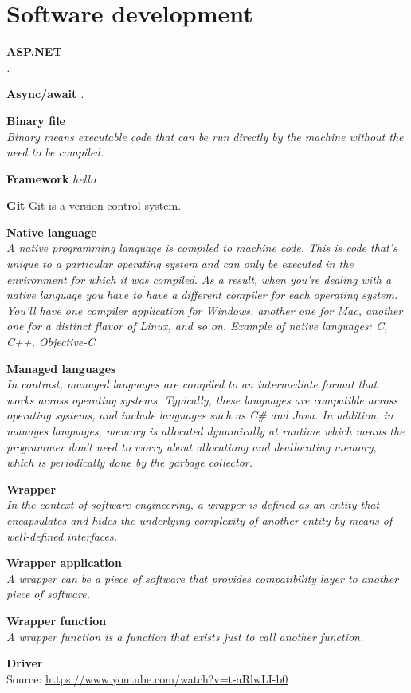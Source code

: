 \section{Software development}

\textbf{ASP.NET} \\
\textit{.} 

\textbf{Async/await}
\textit{.}

\textbf{Binary file} \\
\textit{Binary means executable code that can be run directly by the machine without the need to be compiled.}

\textbf{Framework}
\textit{hello}

\textbf{Git}
Git is a version control system. 

\textbf{Native language} \\
\textit{A native programming language is compiled to machine code. This is code that's unique to a particular operating system and can only be executed in the environment for which it was compiled. As a result, when you're dealing with a native language you have to have a different compiler for each operating system. You'll have one compiler application for Windows, another one for Mac, another one for a distinct flavor of Linux, and so on. Example of native languages: C, C++, Objective-C }

\textbf{Managed languages} \\
\textit{In contrast, managed languages are compiled to an intermediate format that works across operating systems. Typically, these languages are compatible across operating systems, and include languages such as C\# and Java. In addition, in manages languages, memory is allocated dynamically at runtime which means the programmer don't need to worry about allocationg and deallocating memory, which is periodically done by the garbage collector. }


\textbf{Wrapper} \\
\textit{In the context of software engineering, a wrapper is defined as an entity that encapsulates and hides the underlying complexity of another entity by means of well-defined interfaces.}


\textbf{Wrapper application} \\
\textit{A wrapper can be a piece of software that provides compatibility layer to another piece of software.}

\textbf{Wrapper function} \\
\textit{A wrapper function is a function that exists just to call another function. }


\textbf{Driver} \\
Source: \url{https://www.youtube.com/watch?v=t-aRlwLI-b0}

